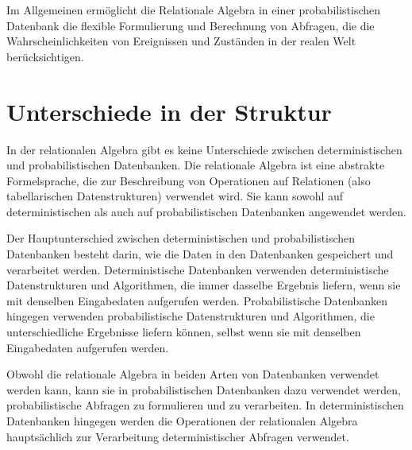 Im Allgemeinen ermöglicht die Relationale Algebra in einer probabilistischen Datenbank die flexible Formulierung und Berechnung von Abfragen, die die Wahrscheinlichkeiten von Ereignissen und Zuständen in der realen Welt berücksichtigen.



\section{Unterschiede in der Struktur}
In der relationalen Algebra gibt es keine Unterschiede zwischen deterministischen und probabilistischen Datenbanken. Die relationale Algebra ist eine abstrakte Formelsprache, die zur Beschreibung von Operationen auf Relationen (also tabellarischen Datenstrukturen) verwendet wird. Sie kann sowohl auf deterministischen als auch auf probabilistischen Datenbanken angewendet werden.

Der Hauptunterschied zwischen deterministischen und probabilistischen Datenbanken besteht darin, wie die Daten in den Datenbanken gespeichert und verarbeitet werden. Deterministische Datenbanken verwenden deterministische Datenstrukturen und Algorithmen, die immer dasselbe Ergebnis liefern, wenn sie mit denselben Eingabedaten aufgerufen werden. Probabilistische Datenbanken hingegen verwenden probabilistische Datenstrukturen und Algorithmen, die unterschiedliche Ergebnisse liefern können, selbst wenn sie mit denselben Eingabedaten aufgerufen werden.

Obwohl die relationale Algebra in beiden Arten von Datenbanken verwendet werden kann, kann sie in probabilistischen Datenbanken dazu verwendet werden, probabilistische Abfragen zu formulieren und zu verarbeiten. In deterministischen Datenbanken hingegen werden die Operationen der relationalen Algebra hauptsächlich zur Verarbeitung deterministischer Abfragen verwendet.







